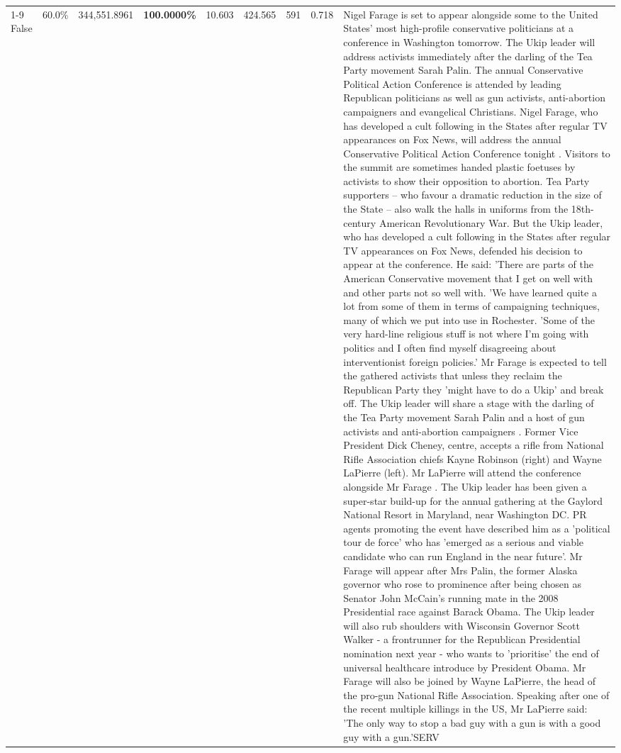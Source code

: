 \begin{table}[H]
\begin{tabular}{lllrlllll}
\cline{1-9}
False & 60.0\% & 344,551.8961 & \bfseries \color{red} 100.0000\% & 10.603 & 424.565 & 591 & 0.718 & Nigel Farage is set to appear alongside some to the United States' most high-profile conservative politicians at a conference in Washington tomorrow. The Ukip leader will address activists immediately after the darling of the Tea Party movement Sarah Palin. The annual Conservative Political Action Conference is attended by leading Republican politicians as well as gun activists, anti-abortion campaigners and evangelical Christians. Nigel Farage, who has developed a cult following in the States after regular TV appearances on Fox News, will address the annual Conservative Political Action Conference tonight . Visitors to the summit are sometimes handed plastic foetuses by activists to show their opposition to abortion. Tea Party supporters – who favour a dramatic reduction in the size of the State – also walk the halls in uniforms from the 18th-century American Revolutionary War. But the Ukip leader, who has developed a cult following in the States after regular TV appearances on Fox News, defended his decision to appear at the conference. He said: 'There are parts of the American Conservative movement that I get on well with and other parts not so well with. 'We have learned quite a lot from some of them in terms of campaigning techniques, many of which we put into use in Rochester. 'Some of the very hard-line religious stuff is not where I'm going with politics and I often find myself disagreeing about interventionist foreign policies.' Mr Farage is expected to tell the gathered activists that unless they reclaim the Republican Party they 'might have to do a Ukip' and break off. The Ukip leader will share a stage with the darling of the Tea Party movement Sarah Palin and a host of gun activists and anti-abortion campaigners . Former Vice President Dick Cheney, centre, accepts a rifle from National Rifle Association chiefs Kayne Robinson (right) and Wayne LaPierre (left). Mr LaPierre will attend the conference alongside Mr Farage . The Ukip leader has been given a super-star build-up for the annual gathering at the Gaylord National Resort in Maryland, near Washington DC. PR agents promoting the event have described him as a 'political tour de force' who has 'emerged as a serious and viable candidate who can run England in the near future'. Mr Farage will appear after Mrs Palin, the former Alaska governor who rose to prominence after being chosen as Senator John McCain's running mate in the 2008 Presidential race against Barack Obama. The Ukip leader will also rub shoulders with Wisconsin Governor Scott Walker - a frontrunner for the Republican Presidential nomination next year - who wants to 'prioritise' the end of universal healthcare introduce by President Obama. Mr Farage will also be joined by Wayne LaPierre, the head of the pro-gun National Rifle Association. Speaking after one of the recent multiple killings in the US, Mr LaPierre said: 'The only way to stop a bad guy with a gun is with a good guy with a gun.'SERV \\

\end{tabular}
\end{table}
